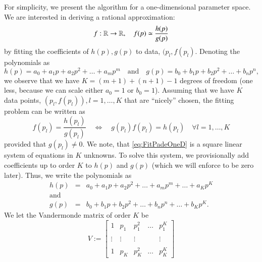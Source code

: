For simplicity, we present the algorithm for a one-dimensional parameter space. We are interested in deriving a rational approximation:
\begin{equation}\label{eq:PadeOneD}
  f : \mathbb{R} \rightarrow \mathbb{R}, \quad f(p) \simeq \frac{h(p)}{g(p)}
\end{equation}
by fitting the coefficients of $h(p), g(p)$ to data, $(p_l, f(p_l)$. Denoting the polynomials
as
\begin{equation}
  h(p) = a_0 + a_1 p + a_2 p^2 + \ldots + a_m p^m \quad \text{and} \quad
  g(p) = b_0 + b_1 p + b_2 p^2 + \ldots + b_n p^n,
\end{equation}
we observe that we have $K=(m+1)+(n+1)-1$ degrees of freedom (one less, because we can scale
either $a_0=1$ or $b_0=1$). Assuming that we have $K$ data points, $\left(p_l, f(p_l)\right), l=1,\ldots,K$
that are ``nicely'' chosen, the fitting problem can be written as
\begin{equation}\label{eq:FitPadeOneD}
  f(p_l) =  \frac{h(p_l)}{g(p_l)} \quad \Leftrightarrow \quad g(p_l)f(p_l) =  h(p_l) \quad \forall l=1,\ldots,K
\end{equation}
provided that $g(p_l) \not = 0$. We note, that \eqref{eq:FitPadeOneD} is a square linear
system of equations in $K$ unknowns. To solve this system, we provisionally add coefficients
up to order $K$ to $h(p)$ and $g(p)$ (which we will enforce to be zero later). Thus, we write
the polynomials as
\begin{equation}
  \begin{array}{rcl}
    h(p) & = & a_0 + a_1 p + a_2 p^2 + \ldots + a_m p^m + \ldots + a_K p^K \\
    \text{and} & & \\
    g(p) & = & b_0 + b_1 p + b_2 p^2 + \ldots + b_n p^n + \ldots + b_K p^K.
  \end{array}
\end{equation}
We let the Vandermonde matrix of order $K$ be
\begin{equation}
  V := \left[ \begin{array}{ccccc}
      1 & p_1 & p_1^2 & \ldots & p_1^K \\
        &     &      &        &       \\
      \vdots & \vdots & \vdots &   & \vdots \\
        &     &      &        &       \\
      1 & p_K & p_K^2 & \ldots & p_K^K 
       \end{array}\right]
\end{equation}
